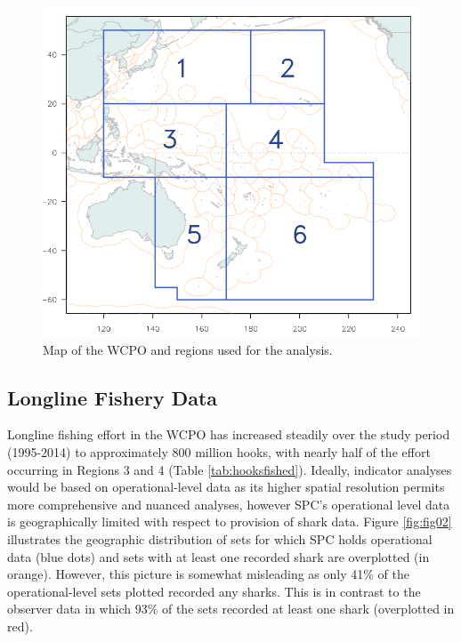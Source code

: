 \documentclass[12pt]{SCreport}
\begin{document}

\begin{figure}
\begin{center}
\includegraphics[width=\textwidth]{../GRAPHICS/Defined/FIG_01_MAP}
\caption{\label{fig:fig01} Map of the WCPO and regions used for the analysis.}
\end{center}
\end{figure}


\subsection{Longline Fishery Data}
  
Longline fishing effort in the WCPO has increased steadily over the study period (1995-2014) to approximately 800 million hooks, with nearly half of the effort occurring in Regions 3 and 4 (Table \ref{tab:hooksfished}).  Ideally, indicator analyses would be based on operational-level data as its higher spatial resolution permits more comprehensive and nuanced analyses, however SPC's operational level data is geographically limited with respect to provision of shark data.  Figure \ref{fig:fig02} illustrates the geographic distribution of sets for which SPC holds operational data (blue dots) and sets with at least one recorded shark are overplotted (in orange). However, this picture is somewhat misleading as only 41\% of the operational-level sets plotted recorded any sharks. This is in contrast to the observer data in which 93\% of the sets recorded at least one shark (overplotted in red).
\end{document}
